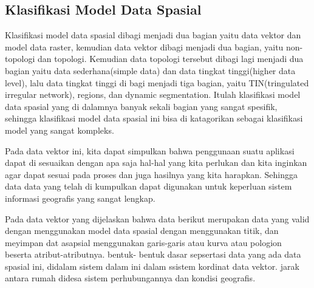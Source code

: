 \subsection{Klasifikasi Model Data Spasial}
Klasifikasi model data spasial dibagi menjadi dua bagian yaitu data vektor dan model data raster, kemudian data vektor dibagi menjadi dua bagian, yaitu non-topologi dan topologi. Kemudian data topologi tersebut dibagi lagi menjadi dua bagian yaitu data sederhana(simple data) dan data tingkat tinggi(higher data level), lalu data tingkat tinggi di bagi menjadi tiga bagian, yaitu TIN(tringulated irregular network), regions, dan dynamic segmentation. Itulah klasifikasi model data spasial yang di dalamnya banyak sekali bagian yang sangat spesifik, sehingga klasifikasi model data spasial ini bisa di katagorikan sebagai klasifikasi model yang sangat kompleks.

Pada data vektor ini, kita dapat simpulkan bahwa penggunaan suatu aplikasi dapat di sesuaikan dengan apa saja hal-hal yang kita perlukan dan kita inginkan agar dapat sesuai pada proses dan juga hasilnya yang kita harapkan. Sehingga data data yang telah di kumpulkan dapat digunakan untuk keperluan sistem informasi geografis yang sangat lengkap.

Pada data vektor yang dijelaskan bahwa data berikut merupakan data yang valid dengan menggunakan model data spasial dengan menggunakan titik, dan meyimpan dat asapsial menggunakan garis-garis atau kurva atau pologion beserta atribut-atributnya. bentuk- bentuk dasar sepsertasi data yang ada data spasial ini, didalam sistem dalam ini dalam ssistem kordinat data vektor. jarak antara rumah didesa sistem perhubungannya dan kondisi geografis.
\cite{Budiyanto2002sistem}
